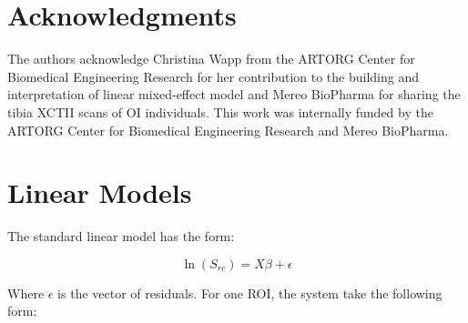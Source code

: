 \documentclass[a4paper,fleqn]{DC_ArtStyle}
\providecommand{\DIFadd}[1]{{\protect\color{blue}{#1}}} %
\providecommand{\DIFaddbegin}{} %
\providecommand{\DIFaddend}{} %
\providecommand{\DIFdelbegin}{} %
\providecommand{\DIFdelend}{} %
\begin{document}
\section*{Acknowledgments}
The authors acknowledge Christina Wapp from the ARTORG Center for Biomedical Engineering Research for her contribution to the building and interpretation of linear mixed-effect model and Mereo BioPharma for sharing the tibia XCTII scans of OI individuals. This work was internally funded by the ARTORG Center for Biomedical Engineering Research and Mereo BioPharma.  \DIFaddbegin \DIFadd{Bettina M. Willie is supported by the Shriners Hospital for Children and the FRQS Programme de bourses de chercheur. 
}\DIFaddend 

\DIFdelbegin %
\DIFdelend %
\appendix
\section{Linear Models}\label{A1}

The standard linear model has the form:

\begin{equation}
	\ln(S_{rc}) = X \beta + \epsilon
\end{equation}

Where $\epsilon$ is the vector of residuals. For one ROI, the system take the following form:
\end{document}

